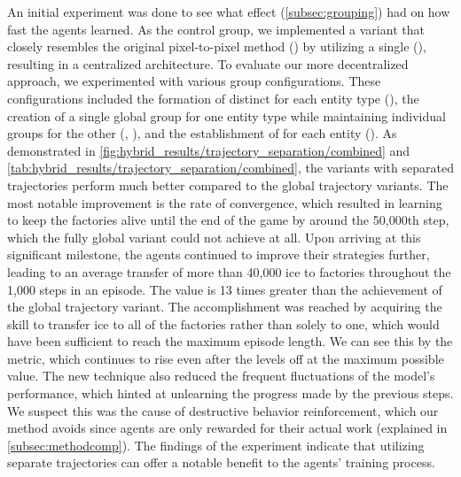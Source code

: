 \noindent An initial experiment was done to see what effect  (\autoref{subsec:grouping}) had on how fast the agents learned. As the control group, we implemented a variant that closely resembles the original pixel-to-pixel method (\cite{chen2023emergent}) by utilizing a single  (), resulting in a centralized architecture. To evaluate our more decentralized approach, we experimented with various group configurations. These configurations included the formation of distinct  for each entity type (), the creation of a single global group for one entity type while maintaining individual groups for the other (, ), and the establishment of  for each entity (). As demonstrated in \autoref{fig:hybrid_results/trajectory_separation/combined} and \autoref{tab:hybrid_results/trajectory_separation/combined}, the variants with separated trajectories perform much better compared to the global trajectory variants. The most notable improvement is the rate of convergence, which resulted in learning to keep the factories alive until the end of the game by around the 50,000th step, which the fully global variant could not achieve at all. Upon arriving at this significant milestone, the agents continued to improve their strategies further, leading to an average transfer of more than 40,000 ice to factories throughout the 1,000 steps in an episode. The value is 13 times greater than the achievement of the global trajectory variant. The accomplishment was reached by acquiring the skill to transfer ice to all of the factories rather than solely to one, which would have been sufficient to reach the maximum episode length. We can see this by the  metric, which continues to rise even after the  levels off at the maximum possible value. The new technique also reduced the frequent fluctuations of the model's performance, which hinted at unlearning the progress made by the previous steps. We suspect this was the cause of destructive behavior reinforcement, which our method avoids since agents are only rewarded for their actual work (explained in \autoref{subsec:methodcomp}). The findings of the experiment indicate that utilizing separate trajectories can offer a notable benefit to the agents' training process.

